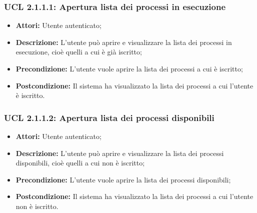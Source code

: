 \hypertarget{L2.1.1.1}{}
\subsubsection{UCL 2.1.1.1: Apertura lista dei processi in esecuzione}
\begin{itemize}
\item \textbf{Attori:} Utente autenticato;
\item \textbf{Descrizione:} L'utente può aprire e visualizzare la lista dei processi in esecuzione, cioè quelli a cui è già iscritto;
\item \textbf{Precondizione:} L'utente vuole aprire la lista dei processi a cui è iscritto;
\item \textbf{Postcondizione:} Il sistema ha visualizzato la lista dei processi a cui l'utente è iscritto.
\end{itemize}

\hypertarget{L2.1.1.2}{}
\subsubsection{UCL 2.1.1.2: Apertura lista dei processi disponibili}
\begin{itemize}
\item \textbf{Attori:} Utente autenticato;
\item \textbf{Descrizione:} L'utente può aprire e visualizzare la lista dei processi disponibili, cioè quelli a cui non è iscritto;
\item \textbf{Precondizione:} L'utente vuole aprire la lista dei processi disponibili;
\item \textbf{Postcondizione:} Il sistema ha visualizzato la lista dei processi a cui l'utente non è iscritto.
\end{itemize}

\hypertarget{L2.1.1.3}{}
